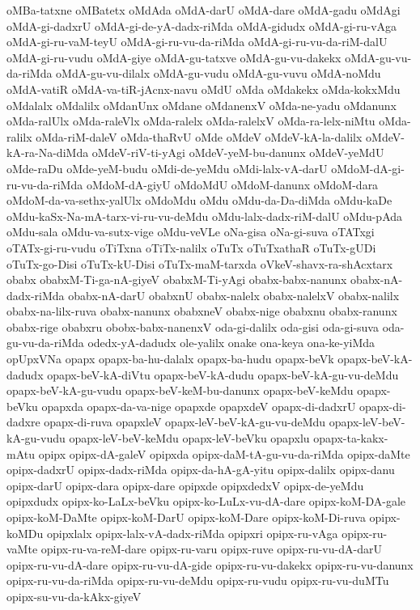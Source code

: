 {oMBa-tatxne
oMBatetx
oMdAda
oMdA-darU
oMdA-dare
oMdA-gadu
oMdAgi
oMdA-gi-dadxrU
oMdA-gi-de-yA-dadx-riMda
oMdA-gidudx
oMdA-gi-ru-vAga
oMdA-gi-ru-vaM-teyU
oMdA-gi-ru-vu-da-riMda
oMdA-gi-ru-vu-da-riM-dalU
oMdA-gi-ru-vudu
oMdA-giye
oMdA-gu-tatxve
oMdA-gu-vu-dakekx
oMdA-gu-vu-da-riMda
oMdA-gu-vu-dilalx
oMdA-gu-vudu
oMdA-gu-vuvu
oMdA-noMdu
oMdA-vatiR
oMdA-va-tiR-jAcnx-navu
oMdU
oMda
oMdakekx
oMda-kokxMdu
oMdalalx
oMdalilx
oMdanUnx
oMdane
oMdanenxV
oMda-ne-yadu
oMdanunx
oMda-ralUlx
oMda-raleVlx
oMda-ralelx
oMda-ralelxV
oMda-ra-lelx-niMtu
oMda-ralilx
oMda-riM-daleV
oMda-thaRvU
oMde
oMdeV
oMdeV-kA-la-dalilx
oMdeV-kA-ra-Na-diMda
oMdeV-riV-ti-yAgi
oMdeV-yeM-bu-danunx
oMdeV-yeMdU
oMde-raDu
oMde-yeM-budu
oMdi-de-yeMdu
oMdi-lalx-vA-darU
oMdoM-dA-gi-ru-vu-da-riMda
oMdoM-dA-giyU
oMdoMdU
oMdoM-danunx
oMdoM-dara
oMdoM-da-va-sethx-yalUlx
oMdoMdu
oMdu
oMdu-da-Da-diMda
oMdu-kaDe
oMdu-kaSx-Na-mA-tarx-vi-ru-vu-deMdu
oMdu-lalx-dadx-riM-dalU
oMdu-pAda
oMdu-sala
oMdu-va-sutx-vige
oMdu-veVLe
oNa-gisa
oNa-gi-suva
oTATxgi
oTATx-gi-ru-vudu
oTiTxna
oTiTx-nalilx
oTuTx
oTuTxathaR
oTuTx-gUDi
oTuTx-go-Disi
oTuTx-kU-Disi
oTuTx-maM-tarxda
oVkeV-shavx-ra-shAcxtarx
obabx
obabxM-Ti-ga-nA-giyeV
obabxM-Ti-yAgi
obabx-babx-nanunx
obabx-nA-dadx-riMda
obabx-nA-darU
obabxnU
obabx-nalelx
obabx-nalelxV
obabx-nalilx
obabx-na-lilx-ruva
obabx-nanunx
obabxneV
obabx-nige
obabxnu
obabx-ranunx
obabx-rige
obabxru
obobx-babx-nanenxV
oda-gi-dalilx
oda-gisi
oda-gi-suva
oda-gu-vu-da-riMda
odedx-yA-dadudx
ole-yalilx
onake
ona-keya
ona-ke-yiMda
opUpxVNa
opapx
opapx-ba-hu-dalalx
opapx-ba-hudu
opapx-beVk
opapx-beV-kA-dadudx
opapx-beV-kA-diVtu
opapx-beV-kA-dudu
opapx-beV-kA-gu-vu-deMdu
opapx-beV-kA-gu-vudu
opapx-beV-keM-bu-danunx
opapx-beV-keMdu
opapx-beVku
opapxda
opapx-da-va-nige
opapxde
opapxdeV
opapx-di-dadxrU
opapx-di-dadxre
opapx-di-ruva
opapxleV
opapx-leV-beV-kA-gu-vu-deMdu
opapx-leV-beV-kA-gu-vudu
opapx-leV-beV-keMdu
opapx-leV-beVku
opapxlu
opapx-ta-kakx-mAtu
opipx
opipx-dA-galeV
opipxda
opipx-daM-tA-gu-vu-da-riMda
opipx-daMte
opipx-dadxrU
opipx-dadx-riMda
opipx-da-hA-gA-yitu
opipx-dalilx
opipx-danu
opipx-darU
opipx-dara
opipx-dare
opipxde
opipxdedxV
opipx-de-yeMdu
opipxdudx
opipx-ko-LaLx-beVku
opipx-ko-LuLx-vu-dA-dare
opipx-koM-DA-gale
opipx-koM-DaMte
opipx-koM-DarU
opipx-koM-Dare
opipx-koM-Di-ruva
opipx-koMDu
opipxlalx
opipx-lalx-vA-dadx-riMda
opipxri
opipx-ru-vAga
opipx-ru-vaMte
opipx-ru-va-reM-dare
opipx-ru-varu
opipx-ruve
opipx-ru-vu-dA-darU
opipx-ru-vu-dA-dare
opipx-ru-vu-dA-gide
opipx-ru-vu-dakekx
opipx-ru-vu-danunx
opipx-ru-vu-da-riMda
opipx-ru-vu-deMdu
opipx-ru-vudu
opipx-ru-vu-duMTu
opipx-su-vu-da-kAkx-giyeV
}
